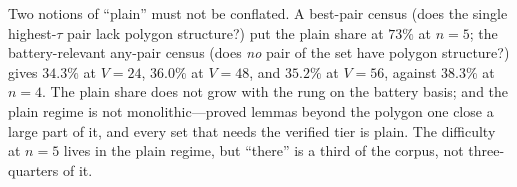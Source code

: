 \begin{remark}\label{rem:plain}
Two notions of ``plain'' must not be conflated. A best-pair census (does
the single highest-$\tau$ pair lack polygon structure?) put the plain
share at $73\%$ at $n=5$; the battery-relevant any-pair census (does
\emph{no} pair of the set have polygon structure?) gives
$34.3\%$ at $V=24$, $36.0\%$ at $V=48$, and $35.2\%$ at $V=56$, against
$38.3\%$ at $n=4$.
The plain share does not grow with the rung on the battery basis; and
the plain regime is not monolithic---proved lemmas beyond the polygon one
close a large part of it, and every set that needs the verified tier is
plain. The difficulty at $n=5$ lives in the plain regime, but ``there''
is a third of the corpus, not three-quarters of it.
\end{remark}
